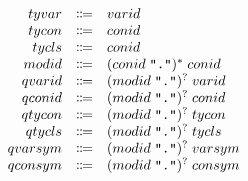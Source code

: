 \begin{align*}
  \begin{array}{rcl}
    {tyvar}
    & \Coloneq & {varid}
    \\
    {tycon}
    & \Coloneq & {conid}
    \\
    {tycls}
    & \Coloneq & {conid}
    \\
    {modid}
    & \Coloneq & ({conid}\; \text{\texttt{\textquotedbl .\textquotedbl}})^*\; {conid}
    \\
    {qvarid}
    & \Coloneq & ({modid}\; \text{\texttt{\textquotedbl .\textquotedbl}})^?\; {varid}
    \\
    {qconid}
    & \Coloneq & ({modid}\; \text{\texttt{\textquotedbl .\textquotedbl}})^?\; {conid}
    \\
    {qtycon}
    & \Coloneq & ({modid}\; \text{\texttt{\textquotedbl .\textquotedbl}})^?\; {tycon}
    \\
    {qtycls}
    & \Coloneq & ({modid}\; \text{\texttt{\textquotedbl .\textquotedbl}})^?\; {tycls}
    \\
    {qvarsym}
    & \Coloneq & ({modid}\; \text{\texttt{\textquotedbl .\textquotedbl}})^?\; {varsym}
    \\
    {qconsym}
    & \Coloneq & ({modid}\; \text{\texttt{\textquotedbl .\textquotedbl}})^?\; {consym}
  \end{array}
\end{align*}

